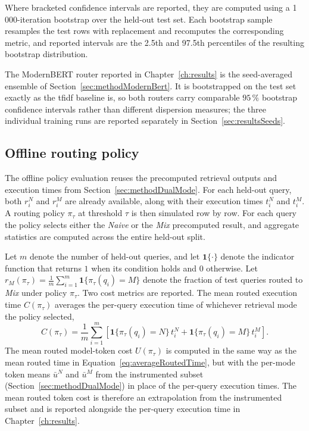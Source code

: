 \documentclass[english, bibtex]{kththesis}               %
\numberwithin{listing}{chapter}
\begin{document}
Where bracketed confidence intervals are reported, they are computed using a 1\,000-iteration bootstrap over the held-out test set. Each bootstrap sample resamples the test rows with replacement and recomputes the corresponding metric, and reported intervals are the 2.5th and 97.5th percentiles of the resulting bootstrap distribution.

The ModernBERT router reported in Chapter~\ref{ch:results} is the seed-averaged ensemble of Section~\ref{sec:methodModernBert}. It is bootstrapped on the test set exactly as the \gls{tfidf} baseline is, so both routers carry comparable $95\,\%$ bootstrap confidence intervals rather than different dispersion measures; the three individual training runs are reported separately in Section~\ref{sec:resultsSeeds}.

\subsection{Offline routing policy}
\label{sec:methodOfflinePolicy}

The offline policy evaluation reuses the precomputed retrieval outputs and execution times from Section~\ref{sec:methodDualMode}. For each held-out query, both \(r_i^N\) and \(r_i^M\) are already available, along with their execution times \(t_i^N\) and \(t_i^M\). A routing policy \(\pi_\tau\) at threshold \(\tau\) is then simulated row by row. For each query the policy selects either the \emph{Naive} or the \emph{Mix} precomputed result, and aggregate statistics are computed across the entire held-out split.

Let \(m\) denote the number of held-out queries, and let \(\mathbf{1}\{\cdot\}\) denote the indicator function that returns \(1\) when its condition holds and \(0\) otherwise. Let \(r_M(\pi_\tau) = \tfrac{1}{m}\sum_{i=1}^{m} \mathbf{1}\{\pi_\tau(q_i)=M\}\) denote the fraction of test queries routed to \emph{Mix} under policy \(\pi_\tau\). Two cost metrics are reported. The mean routed execution time \(C(\pi_\tau)\) averages the per-query execution time of whichever retrieval mode the policy selected,
\begin{equation}
\label{eq:averageRoutedTime}
C(\pi_\tau) =
\frac{1}{m}\sum_{i=1}^{m}
\left[
\mathbf{1}\{\pi_\tau(q_i)=N\}\,t_i^N
+ \mathbf{1}\{\pi_\tau(q_i)=M\}\,t_i^M
\right].
\end{equation}
The mean routed model-token cost \(U(\pi_\tau)\) is computed in the same way as the mean routed time in Equation~\ref{eq:averageRoutedTime}, but with the per-mode token means \(\bar{u}^N\) and \(\bar{u}^M\) from the instrumented subset (Section~\ref{sec:methodDualMode}) in place of the per-query execution times. The mean routed token cost is therefore an extrapolation from the instrumented subset and is reported alongside the per-query execution time in Chapter~\ref{ch:results}.
\end{document}

